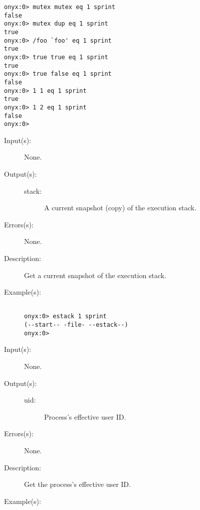 \begin{description}
\begin{description}
\begin{verbatim}
onyx:0> mutex mutex eq 1 sprint
false
onyx:0> mutex dup eq 1 sprint
true
onyx:0> /foo `foo' eq 1 sprint
true
onyx:0> true true eq 1 sprint
true
onyx:0> true false eq 1 sprint
false
onyx:0> 1 1 eq 1 sprint
true
onyx:0> 1 2 eq 1 sprint
false
onyx:0>
		\end{verbatim}
	\end{description}
\label{systemdict:estack}
\item[{\onyxop{--}{estack}{stack}}: ]
	\begin{description}\item[]
	\item[Input(s): ] None.
	\item[Output(s): ]
		\begin{description}\item[]
		\item[stack: ]
			A current snapshot (copy) of the execution stack.
		\end{description}
	\item[Errors(s): ] None.
	\item[Description: ]
		Get a current snapshot of the execution stack.
	\item[Example(s): ]\begin{verbatim}

onyx:0> estack 1 sprint
(--start-- -file- --estack--)
onyx:0>
		\end{verbatim}
	\end{description}
\label{systemdict:euid}
\item[{\onyxop{--}{euid}{uid}}: ]
	\begin{description}\item[]
	\item[Input(s): ] None.
	\item[Output(s): ]
		\begin{description}\item[]
		\item[uid: ]
			Process's effective user ID.
		\end{description}
	\item[Errors(s): ] None.
	\item[Description: ]
		Get the process's effective user ID.
	\item[Example(s): ]\begin{verbatim}


\end{verbatim}
\end{description}
\end{description}
